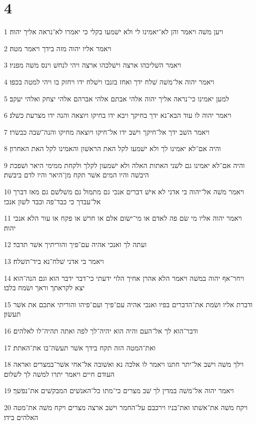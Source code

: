\chapter{4}

\par 1 ויען משׁה ויאמר והן לא־יאמינו לי ולא ישׁמעו בקלי כי יאמרו לא־נראה אליך יהוה׃
\par 2 ויאמר אליו יהוה מזה בידך ויאמר מטה׃
\par 3 ויאמר השׁליכהו ארצה וישׁלכהו ארצה ויהי לנחשׁ וינס משׁה מפניו׃
\par 4 ויאמר יהוה אל־משׁה שׁלח ידך ואחז בזנבו וישׁלח ידו ויחזק בו ויהי למטה בכפו׃
\par 5 למען יאמינו כי־נראה אליך יהוה אלהי אבתם אלהי אברהם אלהי יצחק ואלהי יעקב׃
\par 6 ויאמר יהוה לו עוד הבא־נא ידך בחיקך ויבא ידו בחיקו ויוצאה והנה ידו מצרעת כשׁלג׃
\par 7 ויאמר השׁב ידך אל־חיקך וישׁב ידו אל־חיקו ויוצאה מחיקו והנה־שׁבה כבשׂרו׃
\par 8 והיה אם־לא יאמינו לך ולא ישׁמעו לקל האת הראשׁון והאמינו לקל האת האחרון׃
\par 9 והיה אם־לא יאמינו גם לשׁני האתות האלה ולא ישׁמעון לקלך ולקחת ממימי היאר ושׁפכת היבשׁה והיו המים אשׁר תקח מן־היאר והיו לדם ביבשׁת׃
\par 10 ויאמר משׁה אל־יהוה בי אדני לא אישׁ דברים אנכי גם מתמול גם משׁלשׁם גם מאז דברך אל־עבדך כי כבד־פה וכבד לשׁון אנכי׃
\par 11 ויאמר יהוה אליו מי שׂם פה לאדם או מי־ישׂום אלם או חרשׁ או פקח או עור הלא אנכי יהוה׃
\par 12 ועתה לך ואנכי אהיה עם־פיך והוריתיך אשׁר תדבר׃
\par 13 ויאמר בי אדני שׁלח־נא ביד־תשׁלח׃
\par 14 ויחר־אף יהוה במשׁה ויאמר הלא אהרן אחיך הלוי ידעתי כי־דבר ידבר הוא וגם הנה־הוא יצא לקראתך וראך ושׂמח בלבו׃
\par 15 ודברת אליו ושׂמת את־הדברים בפיו ואנכי אהיה עם־פיך ועם־פיהו והוריתי אתכם את אשׁר תעשׂון׃
\par 16 ודבר־הוא לך אל־העם והיה הוא יהיה־לך לפה ואתה תהיה־לו לאלהים׃
\par 17 ואת־המטה הזה תקח בידך אשׁר תעשׂה־בו את־האתת׃
\par 18 וילך משׁה וישׁב אל־יתר חתנו ויאמר לו אלכה נא ואשׁובה אל־אחי אשׁר־במצרים ואראה העודם חיים ויאמר יתרו למשׁה לך לשׁלום׃
\par 19 ויאמר יהוה אל־משׁה במדין לך שׁב מצרים כי־מתו כל־האנשׁים המבקשׁים את־נפשׁך׃
\par 20 ויקח משׁה את־אשׁתו ואת־בניו וירכבם על־החמר וישׁב ארצה מצרים ויקח משׁה את־מטה האלהים בידו׃
